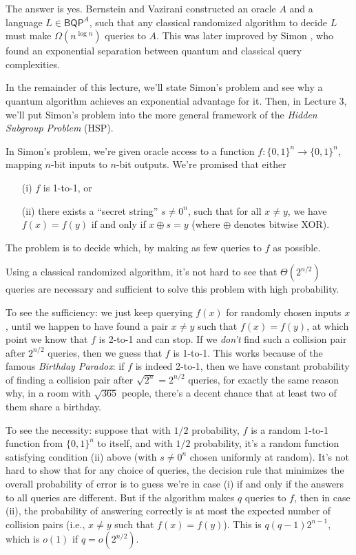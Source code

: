 \documentclass[11pt]{report}
\theoremstyle{plain}
\theoremstyle{definition}
\begin{document}
The answer is yes.  Bernstein and Vazirani \cite{bv} constructed an oracle $A$ and a language $L \in \mathsf{BQP}^A$,
such that any classical randomized algorithm to decide $L$ must make $\Omega(n^{\log n})$ queries to $A$.  This was later
improved by Simon \cite{simon}, who found an exponential separation between quantum and classical query complexities.

In the remainder of this lecture, we'll state Simon's problem and see why a quantum algorithm achieves an exponential
advantage for it. Then, in Lecture 3, we'll put Simon's problem into the more general framework of the {\em Hidden Subgroup Problem}
(HSP).

In Simon's problem, we're given oracle access to a function $f:\{0,1\}^n\longrightarrow \{0,1\}^n$, mapping $n$-bit
inputs to $n$-bit outputs. We're promised that either

\begin{enumerate}
\item[(i)] $f$ is 1-to-1, or
\item[(ii)] there exists a ``secret string'' $s\ne 0^n$, such that for all $x\ne y$, we have $f(x)=f(y)$ if and only if $x\oplus s = y$
(where $\oplus$ denotes bitwise XOR).
\end{enumerate}

\noindent The problem is to decide which, by making as few queries to $f$ as possible.

Using a classical randomized algorithm, it's not hard to see that $\Theta(2^{n/2})$ queries are necessary and sufficient to solve this problem
with high probability.

To see the sufficiency: we just keep querying $f(x)$ for randomly chosen inputs $x$, until we happen to have found a pair $x\ne y$ such that $f(x)=f(y)$, at which
point we know that $f$ is 2-to-1 and can stop. If we {\em don't} find such a collision pair after $2^{n/2}$ queries, then we guess that $f$ is 1-to-1. This works
because of the famous {\em Birthday Paradox}: if $f$ is indeed 2-to-1, then we have constant probability of finding a collision pair after $\sqrt{2^n} = 2^{n/2}$
queries, for exactly the same reason why, in a room with $\sqrt{365}$ people, there's a decent chance that at least two of them share a birthday.

To see the necessity: suppose that with $1/2$ probability, $f$ is a random 1-to-1 function
from $\{0,1\}^n$ to itself, and with $1/2$ probability, it's a random function satisfying condition (ii)
above (with $s\ne 0^n$ chosen uniformly at random).
It's not hard to show that for any choice of queries, the decision rule that minimizes the
overall probability of error is to guess we're in case (i) if and only if the answers to all queries are
different. But if the algorithm makes $q$ queries to $f$, then in case (ii), the probability of answering correctly
is at most the expected number of collision pairs (i.e.,
$x \neq y$ such that $f(x)=f(y)$).  This is $q(q-1)2^{n-1}$, which is $o(1)$ if $q=o(2^{n/2})$.
\end{document}
